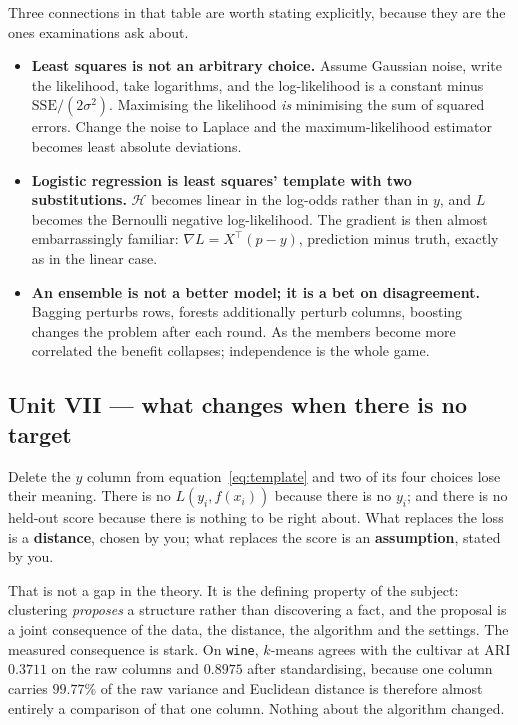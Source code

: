 \documentclass[11pt]{article}
\begin{document}
Three connections in that table are worth stating explicitly, because they are
the ones examinations ask about.

\begin{itemize}[leftmargin=*]
  \item \textbf{Least squares is not an arbitrary choice.} Assume Gaussian
    noise, write the likelihood, take logarithms, and the log-likelihood is a
    constant minus $\mathrm{SSE}/(2\sigma^2)$. Maximising the likelihood
    \emph{is} minimising the sum of squared errors. Change the noise to
    Laplace and the maximum-likelihood estimator becomes least absolute
    deviations.
  \item \textbf{Logistic regression is least squares' template with two
    substitutions.} $\mathcal{H}$ becomes linear in the log-odds rather than
    in $y$, and $L$ becomes the Bernoulli negative log-likelihood. The
    gradient is then almost embarrassingly familiar:
    $\nabla L = X^\top(p - y)$, prediction minus truth, exactly as in the
    linear case.
  \item \textbf{An ensemble is not a better model; it is a bet on
    disagreement.} Bagging perturbs rows, forests additionally perturb
    columns, boosting changes the problem after each round. As the members
    become more correlated the benefit collapses; independence is the whole
    game.
\end{itemize}

\subsection{Unit VII --- what changes when there is no target}

Delete the $y$ column from equation~\eqref{eq:template} and two of its four
choices lose their meaning. There is no $L(y_i, f(x_i))$ because there is no
$y_i$; and there is no held-out score because there is nothing to be right
about. What replaces the loss is a \textbf{distance}, chosen by you; what
replaces the score is an \textbf{assumption}, stated by you.

That is not a gap in the theory. It is the defining property of the subject:
clustering \emph{proposes} a structure rather than discovering a fact, and the
proposal is a joint consequence of the data, the distance, the algorithm and
the settings. The measured consequence is stark. On \texttt{wine},
$k$-means agrees with the cultivar at ARI $0.3711$ on the raw columns and
$0.8975$ after standardising, because one column carries $99.77\%$ of the raw
variance and Euclidean distance is therefore almost entirely a comparison of
that one column. Nothing about the algorithm changed.
\end{document}
